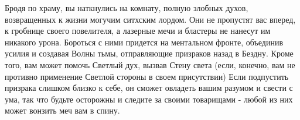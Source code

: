 Бродя по храму, вы наткнулись на комнату, полную злобных духов, возвращенных к жизни могучим ситхским лордом.
Они не пропустят вас вперед, к гробнице своего повелителя, а лазерные мечи и бластеры не нанесут им никакого урона.
Бороться с ними придется на ментальном фронте, объединив усилия и создавая Волны тьмы, отправляющие призраков назад в Бездну.
Кроме того, вам может помочь Светлый дух, вызвав Стену света (если, конечно, вам не противно применение Светлой стороны в своем присутствии)
Если подпустить призрака слишком близко к себе, он сможет овладеть вашим разумом и свести с ума, так что будьте осторожны и следите за своими товарищами - любой из них может вонзить меч вам в спину.
